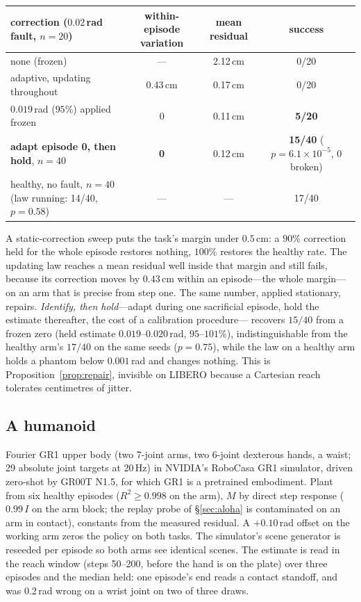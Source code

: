 \documentclass{article}
\begin{document}
\begin{center}\small
\begin{tabular}{lccc}
\toprule
correction ($0.02$\,rad fault, $n=20$) & within-episode variation & mean residual & success \\
\midrule
none (frozen) & --- & 2.12\,cm & 0/20 \\
adaptive, updating throughout & 0.43\,cm & 0.17\,cm & 0/20 \\
$0.019$\,rad ($95\%$) applied frozen & 0 & 0.11\,cm & \textbf{5/20} \\
\textbf{adapt episode 0, then hold}, $n=40$ & \textbf{0} & 0.12\,cm & \textbf{15/40} ($p=6.1\times10^{-5}$, 0 broken) \\
healthy, no fault, $n=40$ (law running: 14/40, $p=0.58$) & --- & --- & 17/40 \\
\bottomrule
\end{tabular}
\end{center}

A static-correction sweep puts the task's margin under $0.5$\,cm: a $90\%$ correction held
for the whole episode restores nothing, $100\%$ restores the healthy rate. The updating law
reaches a mean residual well inside that margin and still fails, because its correction
moves by $0.43$\,cm within an episode---the whole margin---on an arm that is precise from
step one. The same number, applied stationary, repairs. \emph{Identify, then hold}---adapt during one
sacrificial episode, hold the estimate thereafter, the cost of a calibration
procedure--- recovers $15/40$ from a frozen zero (held estimate $0.019$--$0.020$\,rad, $95$--$101\%$),
indistinguishable from the healthy arm's $17/40$ on the same seeds ($p=0.75$), while the law
on a healthy arm holds a phantom below $0.001$\,rad and changes nothing. This is
Proposition~\ref{prop:repair}, invisible on LIBERO because a Cartesian reach tolerates
centimetres of jitter.

\subsection{A humanoid}
\label{sec:gr1}
Fourier GR1 upper body (two 7-joint arms, two 6-joint dexterous hands, a waist; 29
absolute joint targets at 20\,Hz) in NVIDIA's RoboCasa GR1 simulator, driven zero-shot by
GR00T N1.5, for which GR1 is a pretrained embodiment. Plant from six healthy
episodes ($R^2\ge0.998$ on the arm), $M$ by direct step response ($0.99\,I$ on the arm
block; the replay probe of \S\ref{sec:aloha} is contaminated on an arm in contact),
constants from the measured residual. A $+0.10$\,rad offset on the working arm zeros the
policy on both tasks. The simulator's scene generator is reseeded per episode so both arms
see identical scenes. The estimate is read in the reach window (steps 50--200, before the
hand is on the plate) over three episodes and the median held: one episode's end reads a
contact standoff, and was $0.2$\,rad wrong on a wrist joint on two of three draws.
\end{document}
